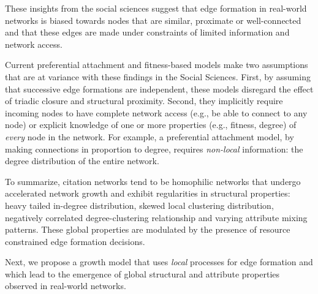 These insights from the social sciences suggest that edge formation in real-world networks is biased towards nodes that are similar, proximate or
well-connected and that these edges are made under constraints of limited information and network access.


Current preferential attachment and fitness-based models
\cite{dorogovtsev2000structure,kim2017effect,singh2017relay,barabasi1999emergence} make two assumptions that are at variance with these findings in the Social Sciences. First, by assuming that successive edge formations are independent, these models disregard the effect of triadic closure and structural proximity. Second, they implicitly require incoming nodes to have complete network access (e.g., be able to connect to any node) or explicit knowledge of one or more properties (e.g., fitness, degree) of \textit{every} node in the network. For example, a preferential attachment model, by making connections in proportion to degree, requires \textit{non-local} information: the degree distribution of the entire network.

To summarize, citation networks tend to be homophilic networks that
undergo accelerated network growth and exhibit regularities in structural
properties: heavy tailed in-degree distribution, skewed local clustering distribution, negatively correlated degree-clustering relationship and varying attribute mixing patterns. These global properties are modulated by the presence of resource constrained edge formation decisions.

Next, we propose a growth model that uses \textit{local} processes for 
edge formation and which lead to the emergence of global structural and attribute properties observed in real-world networks.

